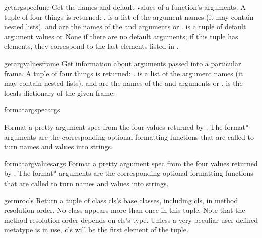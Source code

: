\begin{funcdesc}{getargspec}{func}
  Get the names and default values of a function's arguments.
  A tuple of four things is returned: .
   is a list of the argument names (it may contain nested lists).
   and  are the names of the \code{*} and
  \code{**} arguments or .
   is a tuple of default argument values or None if there are no
  default arguments; if this tuple has  elements, they correspond to
  the last  elements listed in .
\end{funcdesc}

\begin{funcdesc}{getargvalues}{frame}
  Get information about arguments passed into a particular frame.
  A tuple of four things is returned: .
   is a list of the argument names (it may contain nested
  lists).
   and  are the names of the \code{*} and
  \code{**} arguments or .
   is the locals dictionary of the given frame.
\end{funcdesc}

\begin{funcdesc}{formatargspec}{args}

  Format a pretty argument spec from the four values returned by
  .  The format* arguments are the
  corresponding optional formatting functions that are called to turn
  names and values into strings.
\end{funcdesc}

\begin{funcdesc}{formatargvalues}{args}
  Format a pretty argument spec from the four values returned by
  .  The format* arguments are the
  corresponding optional formatting functions that are called to turn
  names and values into strings.
\end{funcdesc}

\begin{funcdesc}{getmro}{cls}
  Return a tuple of class cls's base classes, including cls, in
  method resolution order.  No class appears more than once in this tuple.
  Note that the method resolution order depends on cls's type.  Unless a
  very peculiar user-defined metatype is in use, cls will be the first
  element of the tuple.
\end{funcdesc}

